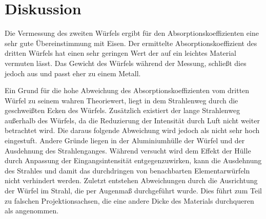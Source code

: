 \section{Diskussion}
\label{sec:Diskussion}

Die Vermessung des zweiten W\"urfels ergibt f\"ur den Absorptionskoeffizienten eine sehr gute \"Ubereinstimmung mit Eisen.
Der ermittelte Absorptionskoeffizient des dritten W\"urfels hat einen sehr geringen Wert der auf ein leichtes Material vermuten l\"asst.
Das Gewicht des W\"urfels w\"ahrend der Messung, schlie{\ss}t dies jedoch aus und passt eher zu einem Metall. 

Ein Grund f\"ur die hohe Abweichung des Absorptionskoeffizienten vom dritten W\"urfel zu seinem wahren Theoriewert, liegt in dem Strahlenweg durch die geschweißten Ecken des W\"urfels. Zus\"atzlich
existiert der lange Strahlenweg au{\ss}erhalb des
W\"urfels, da die Reduzierung der Intensit\"at durch Luft nicht weiter betrachtet wird. Die daraus folgende Abweichung wird jedoch als nicht sehr hoch eingestuft.
Andere Gr\"unde liegen in der Aluminiumh\"ulle der W\"urfel und der Ausdehnung des Strahlenganges.
W\"ahrend versucht wird dem Effekt der H\"ulle durch Anpassung der Eingangsintensit\"at entgegenzuwirken, kann die Ausdehnung des Strahles und damit das durchdringen von benachbarten Elementarw\"urfeln nicht verhindert werden. 
Zuletzt entstehen Abweichungen durch die Ausrichtung der W\"urfel im Strahl, die per Augenma{\ss} durchgef\"uhrt wurde.
Dies f\"uhrt zum Teil zu falschen Projektionsachsen, die eine andere Dicke des Materials durchqueren als angenommen.